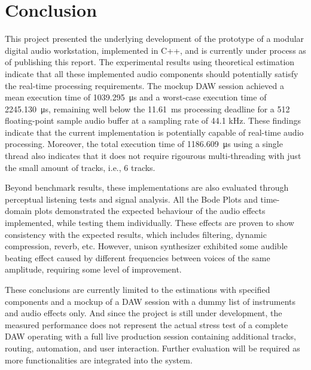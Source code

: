 \section{Conclusion}

This project presented the underlying development of the prototype of
a modular digital audio workstation, implemented in C++, and is
currently under process as of publishing this report. The experimental
results using theoretical estimation indicate that all these implemented
audio components should potentially satisfy the real-time processing 
requirements. The mockup DAW session achieved a 
mean execution time of \SI{1039.295}{\micro\second} and a worst-case 
execution time of \SI{2245.130}{\micro\second}, remaining well below 
the \SI{11.61}{\milli\second} processing deadline for a 512 floating-point
sample audio buffer at a sampling rate of 44.1 kHz. These findings indicate 
that the current implementation is potentially capable of real-time audio processing.
Moreover, the total execution time of \SI{1186.609}{\micro\second} using a single thread
also indicates that it does not require rigourous multi-threading with just the small amount
of tracks, i.e., 6 tracks.

Beyond benchmark results, these implementations are also evaluated through
perceptual listening tests and signal analysis. All the Bode Plots and time-domain 
plots demonstrated the expected behaviour of the audio effects implemented, while
testing them individually. These effects are proven to show consistency with the 
expected results, which includes filtering, dynamic compression, reverb, etc. However, unison
synthesizer exhibited some audible beating effect caused by different frequencies 
between voices of the same amplitude, requiring some level of improvement.

These conclusions are currently limited to the estimations with specified components
and a mockup of a DAW session with a dummy list of instruments and audio effects only. And 
since the project is still under development, 
the measured performance does not represent the actual stress test of a complete DAW 
operating with a full live production session containing additional tracks, routing, 
automation, and user interaction. Further evaluation will be required as more 
functionalities are integrated into the system.

